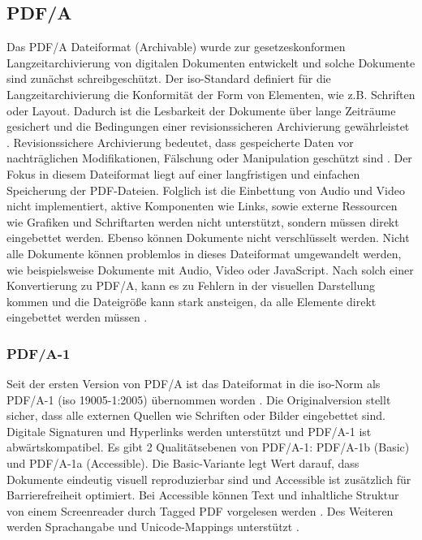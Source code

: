 \subsection{PDF/A}
Das PDF/A Dateiformat (Archivable) wurde zur gesetzeskonformen Langzeitarchivierung von digitalen Dokumenten entwickelt und solche Dokumente sind zunächst schreibgeschützt. Der \gls{iso}-Standard definiert für die Langzeitarchivierung die Konformität der Form von Elementen, wie z.B. Schriften oder Layout. Dadurch ist die Lesbarkeit der Dokumente über lange Zeiträume gesichert und die Bedingungen einer revisionssicheren Archivierung gewährleistet \cite{adobe-pdf-a}. Revisionssichere Archivierung bedeutet, dass gespeicherte Daten vor nachträglichen Modifikationen, Fälschung oder Manipulation geschützt sind \cite{adobe-revisions}. Der Fokus in diesem Dateiformat liegt auf einer langfristigen und einfachen Speicherung der PDF-Dateien. Folglich ist die Einbettung von Audio und Video nicht implementiert, aktive Komponenten wie Links, sowie externe Ressourcen wie Grafiken und Schriftarten werden nicht unterstützt, sondern müssen direkt eingebettet werden. Ebenso können Dokumente nicht verschlüsselt werden. Nicht alle Dokumente können problemlos in dieses Dateiformat umgewandelt werden, wie beispielsweise Dokumente mit Audio, Video oder JavaScript. Nach solch einer Konvertierung zu PDF/A, kann es zu Fehlern in der visuellen Darstellung kommen und die Dateigröße kann stark ansteigen, da alle Elemente direkt eingebettet werden müssen \cite{adobe-pdf-a}.

\subsubsection{PDF/A-1}
Seit der ersten Version von PDF/A ist das Dateiformat in die \gls{iso}-Norm als PDF/A-1 (\gls{iso} 19005-1:2005) übernommen worden \cite{proj-consult}. Die Originalversion stellt sicher, dass alle externen Quellen wie Schriften oder Bilder eingebettet sind. Digitale Signaturen und Hyperlinks werden unterstützt und PDF/A-1 ist abwärtskompatibel. Es gibt 2 Qualitätsebenen von PDF/A-1: PDF/A-1b (Basic) und PDF/A-1a (Accessible). Die Basic-Variante legt Wert darauf, dass Dokumente eindeutig visuell reproduzierbar sind und Accessible ist zusätzlich für Barrierefreiheit optimiert. Bei Accessible können Text und inhaltliche Struktur von einem Screenreader durch Tagged PDF vorgelesen werden \cite{adobe-pdf-a}. Des Weiteren werden Sprachangabe und Unicode-Mappings unterstützt \cite{proj-consult}.

